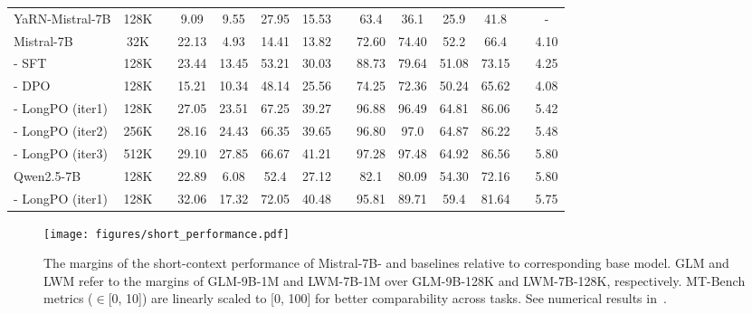 \begin{table}[!t]
{\begin{tabular}{l|c|cccccccccccc}
YaRN-Mistral-7B  & 128K   &  & 9.09   & 9.55    & 27.95  & 15.53 &  & 63.4  & 36.1  & 25.9  & 41.8  &  & -          \\ \hdashline
Mistral-7B       & 32K    &  & 22.13  & 4.93    & 14.41  & 13.82 &  & 72.60  & 74.40  & 52.2  & 66.4  &  & 4.10       \\
- SFT            & 128K   &  & 23.44  & 13.45   & 53.21  & 30.03 &  & 88.73 & 79.64 & 51.08 & 73.15 &  & 4.25       \\
- DPO            & 128K   &  & 15.21  & 10.34   & 48.14  & 25.56 &  & 74.25 & 72.36 & 50.24 & 65.62 &  & 4.08       \\
\rowcolor[HTML]{ECF4FF} 
- LongPO (iter1) & 128K   &  & 27.05  & 23.51   & 67.25  & 39.27 &  & 96.88 & 96.49 & 64.81 & 86.06 &  & 5.42       \\
\rowcolor[HTML]{ECF4FF} 
- LongPO (iter2) & 256K   &  & 28.16  & 24.43   & 66.35  & 39.65 &  & 96.80 & 97.0  & 64.87 & 86.22 &  & 5.48       \\ 
\rowcolor[HTML]{ECF4FF} 
- LongPO (iter3) & 512K  &  & 29.10  & 27.85   & 66.67  & 41.21 &  & 97.28 & 97.48  & 64.92 & 86.56 &  & 5.80       \\ 
\hdashline
Qwen2.5-7B       & 128K    &  & 22.89  & 6.08    & 52.4  & 27.12  &  & 82.1  & 80.09  & 54.30  & 72.16   &  & 5.80       \\
\rowcolor[HTML]{ECF4FF} 
- LongPO (iter1) & 128K   &  & 32.06  & 17.32   & 72.05  & 40.48 &  & 95.81 & 89.71  & 59.4 &  81.64 &  & 5.75       \\

\bottomrule
\end{tabular}
}
    \label{table:long_context_results}
\end{table}


\begin{figure}[!t]
\centering
\texttt{[image: figures/short\_performance.pdf]}
\vspace{-0.5em}
\caption{The margins of the short-context performance of Mistral-7B-\ourMethod{} and baselines relative to corresponding base model. GLM and LWM refer to the margins of GLM-9B-1M and LWM-7B-1M over GLM-9B-128K and LWM-7B-128K, respectively. MT-Bench metrics ($\in$[0, 10]) are linearly scaled to [0, 100] for better comparability across tasks. See numerical results in~.}
\vspace{-1.0em}
\label{fig:short_performance}
\end{figure}

